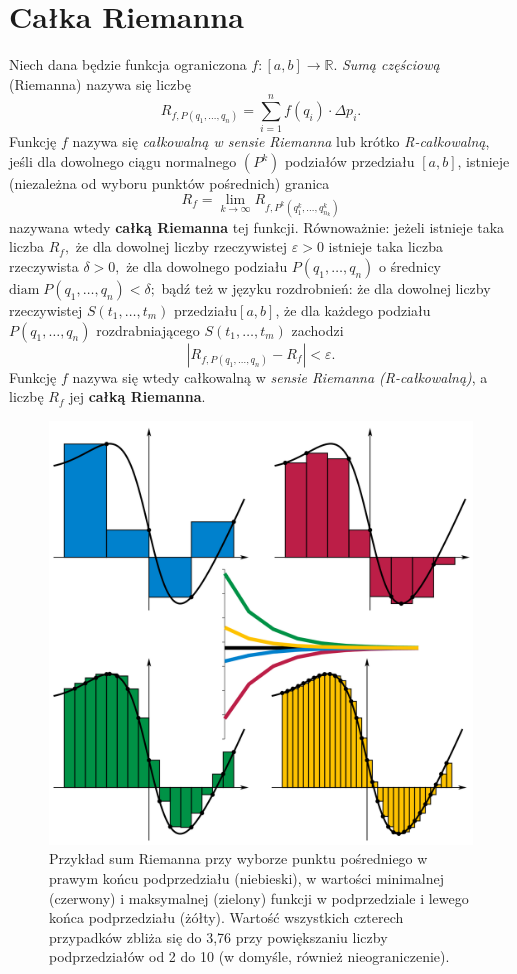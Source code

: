 \documentclass[a4paper,12pt]{article}
\theoremstyle{definition}
\begin{document}

\section*{Całka Riemanna}
Niech dana będzie funkcja ograniczona $ f \colon [a,b] \rightarrow \mathbb{R}$. \textit{\textsf{Sumą częściową}} (Riemanna) nazywa się liczbę
$${R_{f,P(q_{1},\dots ,q_{n})}=\sum _{i=1}^{n}f(q_{i})\cdot \Delta p_{i}.}$$
Funkcję $f$ nazywa się \textit{\textsf{całkowalną w sensie Riemanna}} lub krótko \textit{\textsf{R-całkowalną}}, jeśli dla dowolnego ciągu normalnego $ (P^{k})$ podziałów przedziału $[a,b]$, istnieje (niezależna od wyboru punktów pośrednich) granica
$$
	R_f = \lim_{k \to \infty} R_{f,P^k(q_1^k , \dots , q_{n_k}^k)}
$$
nazywana wtedy \textbf{\textsf{całką Riemanna}} tej funkcji. Równoważnie: jeżeli istnieje taka liczba $R_{f},$  że dla dowolnej liczby rzeczywistej $ \varepsilon >0$  istnieje taka liczba rzeczywista $\delta >0,$ że dla dowolnego podziału $ P(q_{1},\dots ,q_{n})$ o średnicy $ \mathrm {diam} \;P(q_{1},\dots ,q_{n})<\delta ;$ bądź też w języku rozdrobnień: że dla dowolnej liczby rzeczywistej $ S(t_{1},\dots ,t_{m})$ przedziału$[a,b]$, że dla każdego podziału $ P(q_{1},\dots ,q_{n})$ rozdrabniającego $ S(t_{1},\dots ,t_{m})$ zachodzi
$$ \left|R_{f,P(q_{1},\dots ,q_{n})}-R_{f}\right|<\varepsilon . $$
Funkcję $f$ nazywa się wtedy całkowalną w \textit{\textsf{sensie Riemanna (R-całkowalną)}}, a liczbę $R_{f}$ jej \textbf{\textsf{całką Riemanna}}.

\begin{figure}[!htb]
	\centerline{\includegraphics{przykladSum}}
	\caption{Przykład sum Riemanna przy wyborze punktu pośredniego w prawym końcu podprzedziału (niebieski), w wartości minimalnej (czerwony) i maksymalnej (zielony) funkcji w podprzedziale i lewego końca podprzedziału (żółty). Wartość wszystkich czterech przypadków zbliża się do 3,76 przy powiększaniu liczby podprzedziałów od 2 do 10 (w domyśle, również nieograniczenie).}
	\label{fig:Przyklad sum}
\end{figure}
\end{document}
